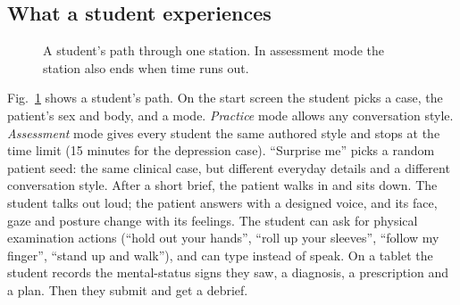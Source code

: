 \documentclass[10pt]{article}
\begin{document}
\subsection{What a student experiences}


\begin{figure}[htbp]
\centering
{}
\caption{A student's path through one station. In assessment mode the station also ends when time runs out.}
\label{p4:fig:journey}
\end{figure}

Fig.~\ref{p4:fig:journey} shows a student's path. On the start screen the student picks a case, the patient's sex and body, and a mode. \emph{Practice} mode allows any conversation style. \emph{Assessment} mode gives every student the same authored style and stops at the time limit (15 minutes for the depression case). ``Surprise me'' picks a random patient seed: the same clinical case, but different everyday details and a different conversation
style. After a short brief, the patient walks in and sits down. The student talks out loud; the patient answers with a designed voice, and its face,
gaze and posture change with its feelings. The student can ask for physical examination actions (``hold out your hands'', ``roll up your sleeves'',
``follow my finger'', ``stand up and walk''), and can type instead of speak. On a tablet the student records the mental-status signs they saw, a
diagnosis, a prescription and a plan. Then they submit and get a debrief.
\end{document}
